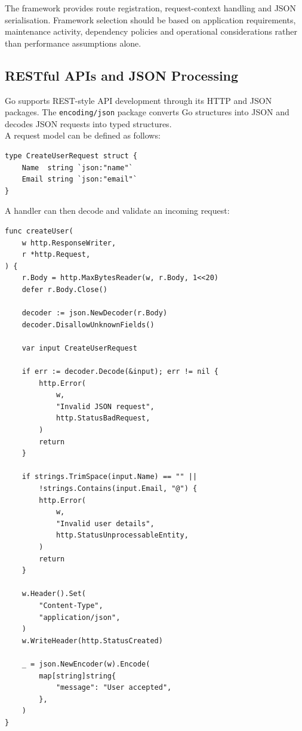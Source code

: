 The framework provides route registration, request-context handling and JSON serialisation. Framework selection should be based on application requirements, maintenance activity, dependency policies and operational considerations rather than performance assumptions alone.\\

\subsection{RESTful APIs and JSON Processing}

Go supports REST-style API development through its HTTP and JSON packages. The \texttt{encoding/json} package converts Go structures into JSON and decodes JSON requests into typed structures.\\

A request model can be defined as follows:

\begin{lstlisting}
type CreateUserRequest struct {
    Name  string `json:"name"`
    Email string `json:"email"`
}
\end{lstlisting}

A handler can then decode and validate an incoming request:

\begin{lstlisting}
func createUser(
    w http.ResponseWriter,
    r *http.Request,
) {
    r.Body = http.MaxBytesReader(w, r.Body, 1<<20)
    defer r.Body.Close()

    decoder := json.NewDecoder(r.Body)
    decoder.DisallowUnknownFields()

    var input CreateUserRequest

    if err := decoder.Decode(&input); err != nil {
        http.Error(
            w,
            "Invalid JSON request",
            http.StatusBadRequest,
        )
        return
    }

    if strings.TrimSpace(input.Name) == "" ||
        !strings.Contains(input.Email, "@") {
        http.Error(
            w,
            "Invalid user details",
            http.StatusUnprocessableEntity,
        )
        return
    }

    w.Header().Set(
        "Content-Type",
        "application/json",
    )
    w.WriteHeader(http.StatusCreated)

    _ = json.NewEncoder(w).Encode(
        map[string]string{
            "message": "User accepted",
        },
    )
}
\end{lstlisting}

